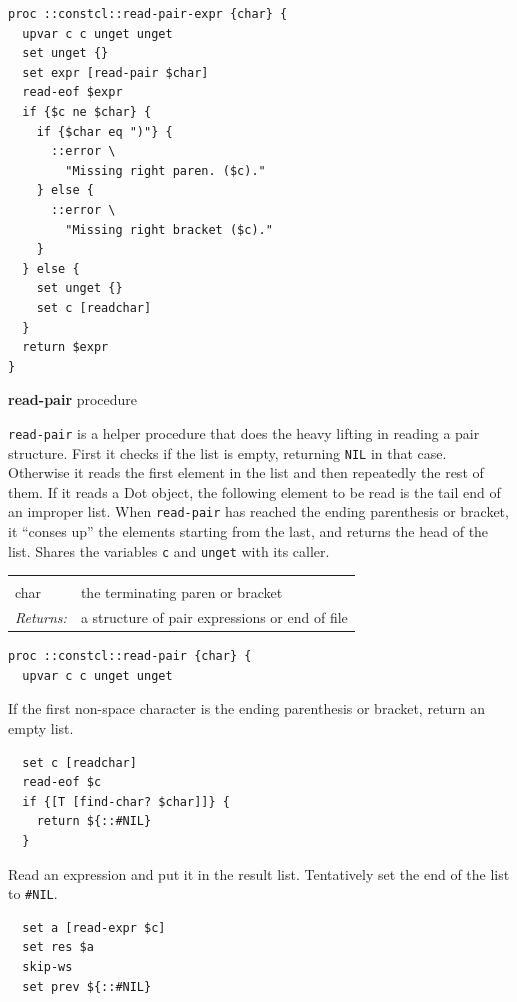 \documentclass[twoside]{report}
\begin{document}
\begin{lstlisting}
proc ::constcl::read-pair-expr {char} {
  upvar c c unget unget
  set unget {}
  set expr [read-pair $char]
  read-eof $expr
  if {$c ne $char} {
    if {$char eq ")"} {
      ::error \
        "Missing right paren. ($c)."
    } else {
      ::error \
        "Missing right bracket ($c)."
    }
  } else {
    set unget {}
    set c [readchar]
  }
  return $expr
}
\end{lstlisting}

\textbf{read-pair} procedure

\texttt{read-pair} is a helper procedure that does the heavy lifting in reading a pair structure. First it checks if the list is empty, returning \texttt{NIL} in that case. Otherwise it reads the first element in the list and then repeatedly the rest of them. If it reads a Dot object, the following element to be read is the tail end of an improper list. When \texttt{read-pair} has reached the ending parenthesis or bracket, it ``conses up'' the elements starting from the last, and returns the head of the list. Shares the variables \texttt{c} and \texttt{unget} with its caller.

\noindent\begin{tabular}{ |p{1.9cm} p{8cm}| }
\hline
\rowcolor[HTML]{CCCCCC} \multicolumn{2}{|l|}{\bf read-pair (internal)} \\
char & the terminating paren or bracket \\
\textit{Returns:} & a structure of pair expressions or end of file \\
\hline
\end{tabular}

\begin{lstlisting}
proc ::constcl::read-pair {char} {
  upvar c c unget unget
\end{lstlisting}

If the first non-space character is the ending parenthesis or bracket, return an empty list.

\begin{lstlisting}
  set c [readchar]
  read-eof $c
  if {[T [find-char? $char]]} {
    return ${::#NIL}
  }
\end{lstlisting}

Read an expression and put it in the result list. Tentatively set the end of the list to \texttt{\#NIL}.

\begin{lstlisting}
  set a [read-expr $c]
  set res $a
  skip-ws
  set prev ${::#NIL}
\end{lstlisting}
\end{document}
